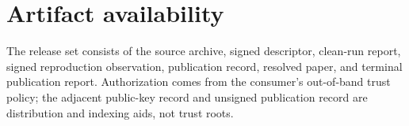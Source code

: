 \documentclass[10pt]{article}
\begin{document}
\section{Artifact availability}

The release set consists of the source archive, signed descriptor, clean-run
report, signed reproduction observation, publication record, resolved paper,
and terminal publication report.  Authorization comes from the consumer's
out-of-band trust policy; the adjacent public-key record and unsigned
publication record are distribution and indexing aids, not trust roots.
\end{document}
